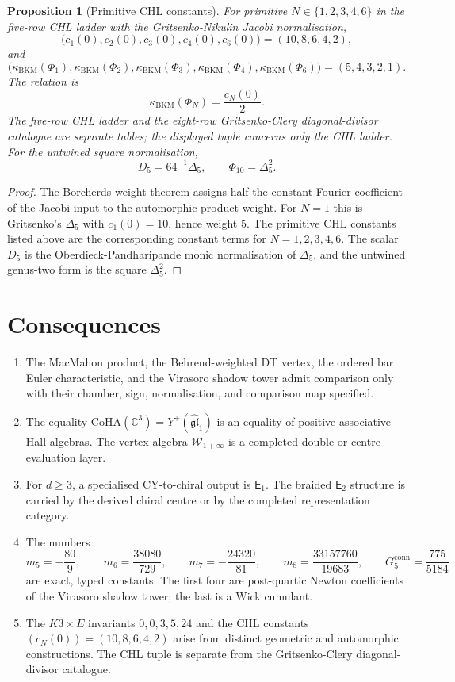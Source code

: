 \documentclass[11pt]{article}
\newtheorem{proposition}[theorem]{Proposition}
\theoremstyle{definition}
\theoremstyle{remark}
\newcommand{\Cthree}{\mathbb{C}^{3}}
\newcommand{\CoHA}{\mathrm{CoHA}}
\newcommand{\Yp}{Y^{+}}
\newcommand{\fglone}{\widehat{\mathfrak{gl}}_{1}}
\newcommand{\Winf}{\mathcal{W}_{1+\infty}}
\newcommand{\Eone}{\mathsf{E}_{1}}
\newcommand{\Etwo}{\mathsf{E}_{2}}
\newcommand{\kBKM}{\kappa_{\mathrm{BKM}}}
\newcommand{\conn}{\mathrm{conn}}
\begin{document}
\begin{proposition}[Primitive CHL constants]
\label{prop:chl-constants}
For primitive $N\in\{1,2,3,4,6\}$ in the five-row CHL ladder with the
Gritsenko-Nikulin Jacobi normalisation,
\[
  \bigl(c_1(0),c_2(0),c_3(0),c_4(0),c_6(0)\bigr)
  =
  (10,8,6,4,2),
\]
and
\[
  \bigl(\kBKM(\Phi_1),\kBKM(\Phi_2),\kBKM(\Phi_3),
        \kBKM(\Phi_4),\kBKM(\Phi_6)\bigr)
  =
  (5,4,3,2,1).
\]
The relation is
\[
  \kBKM(\Phi_N)=\frac{c_N(0)}{2}.
\]
The five-row CHL ladder and the eight-row Gritsenko-Clery
diagonal-divisor catalogue are separate tables; the displayed tuple
concerns only the CHL ladder.
For the untwined square normalisation,
\[
  D_5=64^{-1}\Delta_5,\qquad
  \Phi_{10}=\Delta_5^2.
\]
\end{proposition}

\begin{proof}
The Borcherds weight theorem assigns half the constant Fourier
coefficient of the Jacobi input to the automorphic product weight. For
$N=1$ this is Gritsenko's $\Delta_5$ with $c_1(0)=10$, hence weight
$5$. The primitive CHL constants listed above are the corresponding
constant terms for $N=1,2,3,4,6$. The scalar $D_5$ is the
Oberdieck-Pandharipande monic normalisation of $\Delta_5$, and the
untwined genus-two form is the square $\Delta_5^2$.
\end{proof}

\section{Consequences}
\label{sec:consequences}

\begin{enumerate}[label=\textup{(\arabic*)}]
\item The MacMahon product, the Behrend-weighted DT vertex, the ordered
bar Euler characteristic, and the Virasoro shadow tower admit comparison
only with their chamber, sign, normalisation, and comparison map
specified.
\item The equality $\CoHA(\Cthree)=\Yp(\fglone)$ is an equality of
positive associative Hall algebras. The vertex algebra $\Winf$ is a
completed double or centre evaluation layer.
\item For $d\geq3$, a specialised CY-to-chiral output is $\Eone$. The
braided $\Etwo$ structure is carried by the derived chiral centre or by
the completed representation category.
\item The numbers
\[
  m_5=-\frac{80}{9},\qquad
  m_6=\frac{38080}{729},\qquad
  m_7=-\frac{24320}{81},\qquad
  m_8=\frac{33157760}{19683},\qquad
  G_5^{\conn}=\frac{775}{5184}
\]
are exact, typed constants. The first four are post-quartic Newton
coefficients of the Virasoro shadow tower; the last is a Wick cumulant.
\item The $K3\times E$ invariants
$0,0,3,5,24$ and the CHL constants
$(c_N(0))=(10,8,6,4,2)$ arise from distinct geometric and automorphic
constructions. The CHL tuple is separate from the Gritsenko-Clery
diagonal-divisor catalogue.
\end{enumerate}
\end{document}
